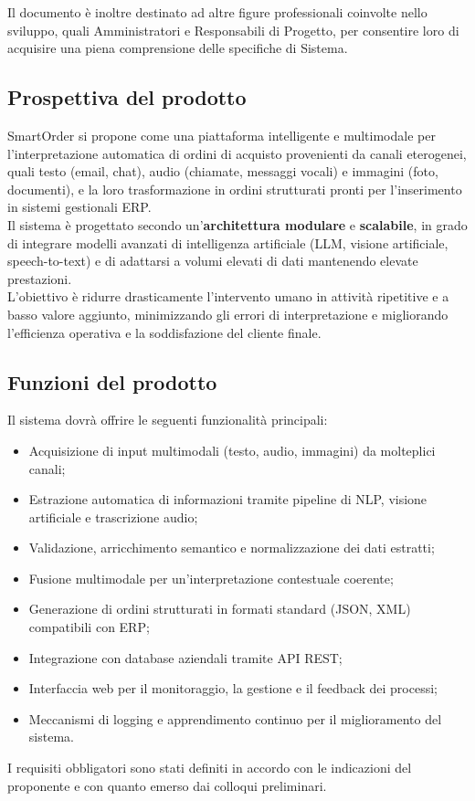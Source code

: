     Il documento è inoltre destinato ad altre figure professionali coinvolte nello sviluppo, quali Amministratori e Responsabili di Progetto, per consentire loro di acquisire una piena comprensione delle specifiche di Sistema.

	\subsection{Prospettiva del prodotto}
	SmartOrder si propone come una piattaforma intelligente e multimodale per l'interpretazione automatica di ordini di acquisto provenienti da canali eterogenei, quali testo (email, chat), audio (chiamate, messaggi vocali) e immagini (foto, documenti), e la loro trasformazione in ordini strutturati pronti per l'inserimento in sistemi gestionali ERP.\\
    Il sistema è progettato secondo un'\textbf{architettura modulare} e \textbf{scalabile}, in grado di integrare modelli avanzati di intelligenza artificiale (LLM, visione artificiale, speech-to-text) e di adattarsi a volumi elevati di dati mantenendo elevate prestazioni.\\
	L'obiettivo è ridurre drasticamente l'intervento umano in attività ripetitive e a basso valore aggiunto, minimizzando gli errori di interpretazione e migliorando l'efficienza operativa e la soddisfazione del cliente finale.
	
	\subsection{Funzioni del prodotto}
	Il sistema dovrà offrire le seguenti funzionalità principali:
	\begin{itemize}
	    \item Acquisizione di input multimodali (testo, audio, immagini) da molteplici canali;
	    \item Estrazione automatica di informazioni tramite pipeline di NLP, visione artificiale e trascrizione audio;
	    \item Validazione, arricchimento semantico e normalizzazione dei dati estratti;
	    \item Fusione multimodale per un'interpretazione contestuale coerente;
	    \item Generazione di ordini strutturati in formati standard (JSON, XML) compatibili con ERP;
	    \item Integrazione con database aziendali tramite API REST;
	    \item Interfaccia web per il monitoraggio, la gestione e il feedback dei processi;
	    \item Meccanismi di logging e apprendimento continuo per il miglioramento del sistema.
	\end{itemize}
	I requisiti obbligatori sono stati definiti in accordo con le indicazioni del proponente e con quanto emerso dai colloqui preliminari.

